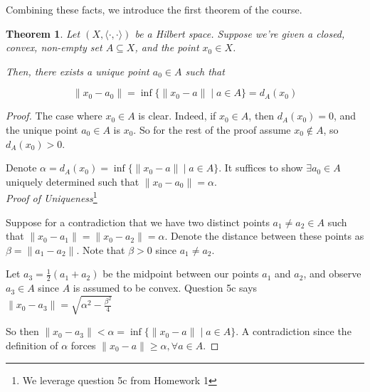 \documentclass[11pt]{amsart}
\newtheorem{theorem}{Theorem}[section]
\theoremstyle{definition}
\numberwithin{equation}{section}
\newcommand{\ips}{ \left( X, \langle \cdot, \cdot \rangle \right) }		%
\begin{document}
Combining these facts, we introduce the first theorem of the course. 

\begin{theorem} \label{thm:23}
Let $\ips$ be a Hilbert space. Suppose we're given a closed, convex, non-empty set $A \subseteq X$, and the point $x_0 \in X$.

 Then, there exists a unique point $a_0 \in A$ such that 
 
 \[ \| x_0 - a_0 \| = \inf \{ \| x_0 - a \| \; | \; a \in A \} = d_A(x_0) \]
\end{theorem}

\vspace{6pt}

\begin{proof} The case where $x_0 \in A$ is clear. Indeed, if $x_0 \in A$, then $d_A(x_0) = 0$, and the unique point $a_0 \in A$ is $x_0$. So for the rest of the proof assume $x_0 \not \in A$, so $d_A(x_0) > 0$. 

\vspace{6pt}

Denote $\alpha = d_A(x_0) = \inf \{ \| x_0 - a \| \: | \; a \in A \}$. It suffices to show $\exists a_0 \in A$ uniquely determined such that $\| x_0 - a_0 \| = \alpha$. \\

\noindent \textit{Proof of Uniqueness}\footnote{We leverage question 5c from Homework 1}

\vspace{6pt}

Suppose for a contradiction that we have two distinct points $a_1 \not = a_2 \in A$ such that $\| x_0 - a_1 \| = \| x_0 - a_2 \| = \alpha$. Denote the distance between these points as $\beta = \| a_1 - a_2 \|$. Note that $\beta > 0$ since $a_1 \not = a_2$. 

\vspace{6pt}

Let $a_3 = \frac 1 2 (a_1 + a_2)$ be the midpoint between our points $a_1$ and $a_2$, and observe $a_3 \in A$ since $A$ is assumed to be convex. Question 5c says $\| x_0 - a_3 \| = \sqrt{ \alpha^2 - \frac{\beta^2} 4 }$

\vspace{6pt}

So then $\| x_0 - a_3 \| < \alpha = \inf \{ \| x_0 - a \| \; | \; a \in A \}$. {\color{red} A contradiction} since the definition of $\alpha$ forces $\| x_0 - a \| \ge \alpha, \forall a \in A$. \end{proof}
\end{document}
